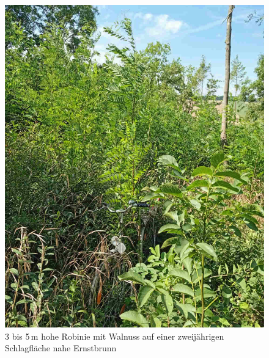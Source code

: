 \documentclass[twocolumn]{scrartcl}
\begin{document}
\begin{figure}[htbp]
  \centering
  \includegraphics[width=.9\linewidth]{./bild/ernstbrunnSchlagflaeche}
  \caption{3 bis 5\,m hohe Robinie mit Walnuss auf einer zweijährigen Schlagfläche nahe Ernstbrunn}
  \label{fig:ernstbrunnSchlagflaeche}
\end{figure}
\end{document}
